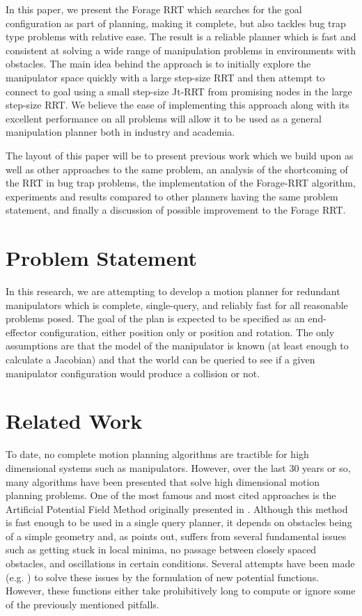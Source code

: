 \documentclass[conference]{IEEEtran}
\begin{document}
In this paper, we present the Forage RRT which searches for the goal configuration as part of planning, making it complete, but also tackles
bug trap type problems with relative ease. The result is a reliable planner which is fast and consistent at solving a wide range of
manipulation problems in environments with obstacles. The main idea behind the approach is to initially explore the manipulator space
quickly with a large step-size RRT and then attempt to connect to goal using a small step-size Jt-RRT from promising nodes in the large
step-size RRT. We believe the ease of implementing this approach along with its excellent performance on all problems will allow it to be
used as a general manipulation planner both in industry and academia.

The layout of this paper will be to present previous work which we build upon as well as other approaches to the same problem, an analysis
of the shortcoming of the RRT in bug trap problems, the implementation of the Forage-RRT algorithm, experiments and results compared to
other planners having the same problem statement, and finally a discussion of possible improvement to the Forage RRT.  

\section{Problem Statement}
In this research, we are attempting to develop a motion planner for redundant manipulators which is complete, single-query, and reliably
fast for all reasonable problems posed. The goal of the plan is expected to be specified as an end-effector configuration, either position
only or position and rotation. The only assumptions are that the model of the manipulator is known (at least enough to calculate a
Jacobian) and that the world can be queried to see if a given manipulator configuration would produce a collision or not.

\section{Related Work}
To date, no complete motion planning algorithms are tractible for high dimensional systems such as manipulators. However, over the last 30
years or so, many algorithms have been presented that solve high dimensional motion planning problems. One of the most famous and most cited
approaches is the Artificial Potential Field Method originally presented in \cite{khatib86}. Although this method is fast enough to be
used in a single query planner, it depends on obstacles being of a simple geometry and, as \cite{koren91} points out, suffers from several
fundamental issues such as getting stuck in local minima, no passage between closely spaced obstacles, and oscillations in certain
conditions. Several attempts have been made (e.g. \cite{connolly90} \cite{ge00}) to solve these issues by the formulation of new potential
functions. However, these functions either take prohibitively long to compute or ignore some of the previously mentioned pitfalls. 
\end{document}
